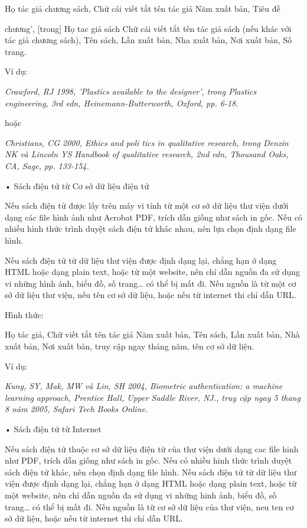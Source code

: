 \documentclass{hcmutarticle}
\begin{document}
Họ tác giả chương sách, Chữ cái viết tắt tên tác giả Năm xuất bản, Tiêu đề

chương’, [trong] Họ tac giả sách Chữ cái viết tắt tên tác giả sách (nếu khác với tác giả chương sách), Tên sách, Lần xuất bản, Nha xuất bản, Nơi xuất bản, Số trang.

Ví dụ:

{\em Crawford, RJ 1998, 'Plastics available to the designer', trong Plastics engineering, 3rd edn, Heinemann-Butterworth, Oxford, pp. 6-18.}

hoặc

{\em Christians, CG 2000, Ethics and poli tics in qualitative research, trong Denzin NK và Lincoln YS Handbook of qualitative research, 2nd edn, Thousand Oaks, CA, Sage, pp. 133-154.}

•	Sách điện tử từ Cơ sở dữ liệu điện tử

Nếu sách điện tử được lấy trên máy vi tính từ một cơ sở dữ liệu thư viện dưới dạng các file hình ảnh như Acrobat PDF, trích dẫn giống như sách in gốc. Nếu có nhiều hình thức trình duyệt sách điện tử khác nhau, nên lựa chọn định dạng file hình.

 Nếu sách điện tử từ dữ liệu thư viện được định dạng lại, chẳng hạn ở dạng HTML hoặc dạng plain text, hoặc từ một website, nên chỉ dẫn nguồn đa sử dụng vi những hình ảnh, biểu đồ, số trang… có thể bị mất đi. Nếu nguồn là từ một cơ sở dữ liệu thư viện, nếu tên cơ sở dữ liệu, hoặc nếu từ internet thi chỉ dẫn URL.
 
Hình thức:

Họ tác giả, Chữ viết tắt tên tác giả Năm xuất bản, Tên sách, Lần xuất bản, Nhà xuất bản, Nơi xuất bản, truy cập ngay tháng năm, tên cơ sở dữ liệu.

Ví dụ:

{\em Kung, SY, Mak, MW và Lin, SH 2004, Biometric authentication: a machine learning approach, Prentice Hall, Upper Saddle River, NJ., truy cập ngay 5 thang 8 năm 2005, Safari Tech Books Online.}

•	Sách điện tử từ Internet

Nếu sách điện tử thuộc cơ sở dữ liệu điện tử của thư viện dưới dạng cac file hinh như PDF, trích dẫn giống như sách in gốc. Nếu có nhiều hinh thức trình duyệt sách điện tử khác, nên chọn định dạng file hình. Nếu sách điện tử từ dữ liệu thư viện được định dạng lại, chẳng hạn ở dạng HTML hoặc dạng plain text, hoặc từ một website, nên chỉ dẫn nguồn đa sử dụng vi những hinh ảnh, biểu đồ, số trang… có thể bị mất đi. Nếu nguồn là từ cơ sở dữ liệu của thư viện, neu ten cơ sở dữ liệu, hoặc nếu từ internet thi chỉ dẫn URL.
\end{document}
